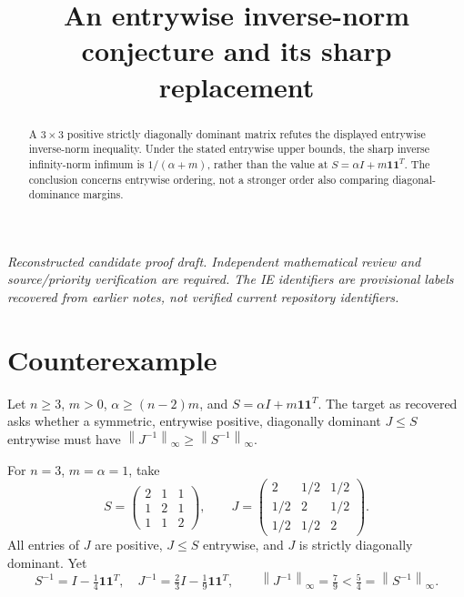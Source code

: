 \documentclass[11pt]{article}
\title{An entrywise inverse-norm conjecture and its sharp replacement}
\author{}
\date{}
\newcommand{\norm}[1]{\left\lVert#1\right\rVert}
\newcommand{\one}{\boldsymbol 1}
\begin{document}
\maketitle
\noindent\textit{Reconstructed candidate proof draft. Independent mathematical review and source/priority verification are required. The IE identifiers are provisional labels recovered from earlier notes, not verified current repository identifiers.}


\begin{abstract}
A $3\times3$ positive strictly diagonally dominant matrix refutes the displayed entrywise inverse-norm inequality. Under the stated entrywise upper bounds, the sharp inverse infinity-norm infimum is $1/(\alpha+m)$, rather than the value at $S=\alpha I+m\one\one^T$. The conclusion concerns entrywise ordering, not a stronger order also comparing diagonal-dominance margins.
\end{abstract}
\section{Counterexample}
Let $n\ge3$, $m>0$, $\alpha\ge(n-2)m$, and $S=\alpha I+m\one\one^T$. The target as recovered asks whether a symmetric, entrywise positive, diagonally dominant $J\le S$ entrywise must have $\norm{J^{-1}}_\infty\ge\norm{S^{-1}}_\infty$.

For $n=3$, $m=\alpha=1$, take
\[
S=\begin{pmatrix}2&1&1\\1&2&1\\1&1&2\end{pmatrix},\qquad
J=\begin{pmatrix}2&1/2&1/2\\1/2&2&1/2\\1/2&1/2&2\end{pmatrix}.
\]
All entries of $J$ are positive, $J\le S$ entrywise, and $J$ is strictly diagonally dominant. Yet
\[
S^{-1}=I-\tfrac14\one\one^T,\quad J^{-1}=\tfrac23I-\tfrac19\one\one^T,
\qquad\boxed{\norm{J^{-1}}_\infty=\tfrac79<\tfrac54=\norm{S^{-1}}_\infty.}
\]
\end{document}
